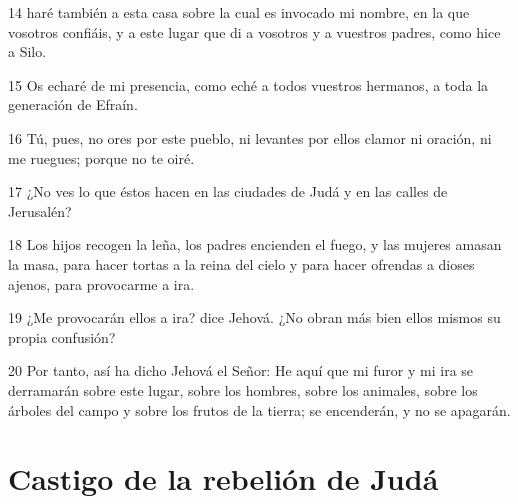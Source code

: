 \par 14 haré también a esta casa sobre la cual es invocado mi nombre, en la que vosotros confiáis, y a este lugar que di a vosotros y a vuestros padres, como hice a Silo. 
\par 15 Os echaré de mi presencia, como eché a todos vuestros hermanos, a toda la generación de Efraín.
\par 16 Tú, pues, no ores por este pueblo, ni levantes por ellos clamor ni oración, ni me ruegues; porque no te oiré.
\par 17 ¿No ves lo que éstos hacen en las ciudades de Judá y en las calles de Jerusalén?
\par 18 Los hijos recogen la leña, los padres encienden el fuego, y las mujeres amasan la masa, para hacer tortas a la reina del cielo y para hacer ofrendas a dioses ajenos, para provocarme a ira.
\par 19 ¿Me provocarán ellos a ira? dice Jehová. ¿No obran más bien ellos mismos su propia confusión?
\par 20 Por tanto, así ha dicho Jehová el Señor: He aquí que mi furor y mi ira se derramarán sobre este lugar, sobre los hombres, sobre los animales, sobre los árboles del campo y sobre los frutos de la tierra; se encenderán, y no se apagarán.

\section*{Castigo de la rebelión de Judá}

